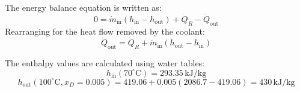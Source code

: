 The energy balance equation is written as:  
\[
0 = \dot{m}_{\text{in}} (h_{\text{in}} - h_{\text{out}}) + \dot{Q}_R - \dot{Q}_{\text{out}}
\]  
Rearranging for the heat flow removed by the coolant:  
\[
\dot{Q}_{\text{out}} = \dot{Q}_R + \dot{m}_{\text{in}} (h_{\text{out}} - h_{\text{in}})
\]  

The enthalpy values are calculated using water tables:  
\[
h_{\text{in}}(70^\circ\text{C}) = 293.35 \, \text{kJ/kg}
\]  
\[
h_{\text{out}}(100^\circ\text{C}, x_D = 0.005) = 419.06 + 0.005(2086.7 - 419.06) = 430 \, \text{kJ/kg}
\]